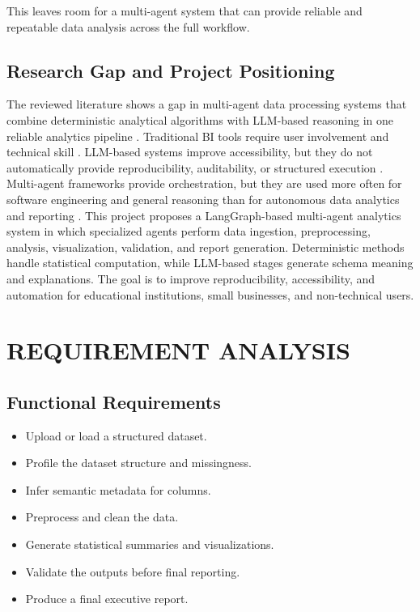 \documentclass[12pt,a4paper,openany]{report}
\begin{document}
This leaves room for a multi-agent system that can provide reliable and repeatable data analysis across the full workflow.

\section{Research Gap and Project Positioning}
The reviewed literature shows a gap in multi-agent data processing systems that combine deterministic analytical algorithms with LLM-based reasoning in one reliable analytics pipeline \cite{sun2024, wu2023}. Traditional BI tools require user involvement and technical skill \cite{dwivedi2023}. LLM-based systems improve accessibility, but they do not automatically provide reproducibility, auditability, or structured execution \cite{liu2023chatgpt, maynez2020faithfulness}. Multi-agent frameworks provide orchestration, but they are used more often for software engineering and general reasoning than for autonomous data analytics and reporting \cite{wu2023, langchain2024}.
This project proposes a LangGraph-based multi-agent analytics system in which specialized agents perform data ingestion, preprocessing, analysis, visualization, validation, and report generation. Deterministic methods handle statistical computation, while LLM-based stages generate schema meaning and explanations. The goal is to improve reproducibility, accessibility, and automation for educational institutions, small businesses, and non-technical users.

\chapter{REQUIREMENT ANALYSIS}

\section{Functional Requirements}
\begin{itemize}
		\item Upload or load a structured dataset.
		\item Profile the dataset structure and missingness.
		\item Infer semantic metadata for columns.
		\item Preprocess and clean the data.
		\item Generate statistical summaries and visualizations.
		\item Validate the outputs before final reporting.
		\item Produce a final executive report.
\end{itemize}
\end{document}
